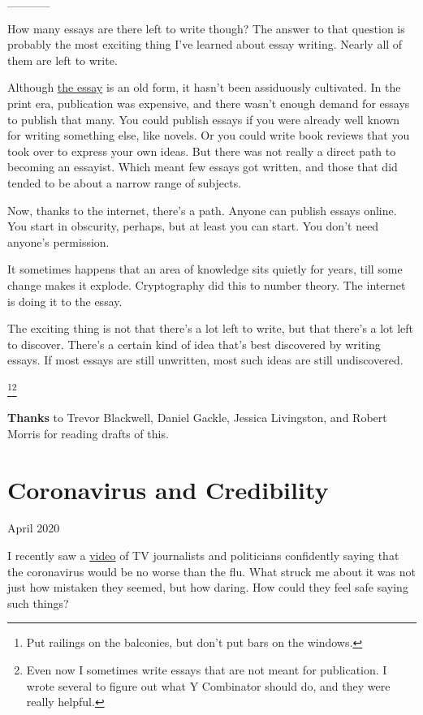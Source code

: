 \documentclass[12pt]{book}
\begin{document}
\_\_\_\_\_

How many essays are there left to write though? The answer to that
question is probably the most exciting thing I've learned about essay
writing. Nearly all of them are left to write.

Although \href{essay.html}{the essay} is an old form, it hasn't been
assiduously cultivated. In the print era, publication was expensive, and
there wasn't enough demand for essays to publish that many. You could
publish essays if you were already well known for writing something
else, like novels. Or you could write book reviews that you took over to
express your own ideas. But there was not really a direct path to
becoming an essayist. Which meant few essays got written, and those that
did tended to be about a narrow range of subjects.

Now, thanks to the internet, there's a path. Anyone can publish essays
online. You start in obscurity, perhaps, but at least you can start. You
don't need anyone's permission.

It sometimes happens that an area of knowledge sits quietly for years,
till some change makes it explode. Cryptography did this to number
theory. The internet is doing it to the essay.

The exciting thing is not that there's a lot left to write, but that
there's a lot left to discover. There's a certain kind of idea that's
best discovered by writing essays. If most essays are still unwritten,
most such ideas are still undiscovered.


\footnote{Put railings on the balconies, but don't put bars on the
windows.}\footnote{Even now I sometimes write essays that are not meant for
publication. I wrote several to figure out what Y Combinator should do,
and they were really helpful.}

\textbf{Thanks} to Trevor Blackwell, Daniel Gackle, Jessica Livingston,
and Robert Morris for reading drafts of this.
\chapter{Coronavirus and Credibility}

April 2020

I recently saw a
\href{https://www.youtube.com/watch?v=NAh4uS4f78o}{video} of TV
journalists and politicians confidently saying that the coronavirus
would be no worse than the flu. What struck me about it was not just how
mistaken they seemed, but how daring. How could they feel safe saying
such things?
\end{document}
